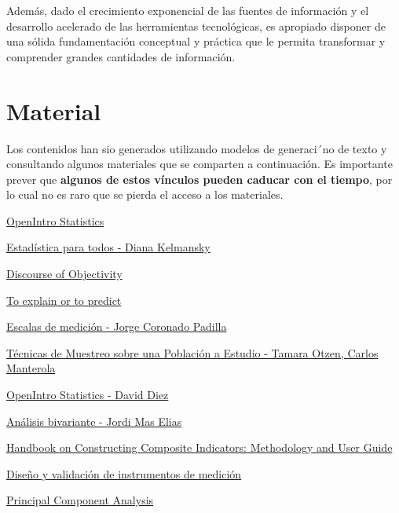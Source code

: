 \documentclass[
  letterpaper,
  DIV=11,
  numbers=noendperiod]{scrreprt}
\begin{document}
Además, dado el crecimiento exponencial de las fuentes de información y
el desarrollo acelerado de las herramientas tecnológicas, es apropiado
disponer de una sólida fundamentación conceptual y práctica que le
permita transformar y comprender grandes cantidades de información.

\section*{Material}\label{material}


Los contenidos han sio generados utilizando modelos de generaci´no de
texto y consultando algunos materiales que se comparten a continuación.
Es importante prever que \textbf{algunos de estos vínculos pueden
caducar con el tiempo}, por lo cual no es raro que se pierda el acceso a
los materiales.

\href{https://openintro.org/book/os/}{OpenIntro Statistics}

\href{http://www.bnm.me.gov.ar/giga1/documentos/EL001858.pdf}{Estadística
para todos - Diana Kelmansky}

\href{https://ayushthey.medium.com/discourse-of-objectivity-2eb2541f7177}{Discourse
of Objectivity}

\href{https://www.stat.berkeley.edu/~aldous/157/Papers/shmueli.pdf}{To
explain or to predict}

\href{https://dialnet.unirioja.es/descarga/articulo/4942056.pdf}{Escalas
de medición - Jorge Coronado Padilla}

\href{https://scielo.conicyt.cl/pdf/ijmorphol/v35n1/art37.pdf}{Técnicas
de Muestreo sobre una Población a Estudio - Tamara Otzen, Carlos
Manterola}

\href{https://openintro.org/go/?id=os4_for_screen_readers&referrer=/book/os/index.php}{OpenIntro
Statistics - David Diez}

\href{https://openaccess.uoc.edu/bitstream/10609/148455/1/AnalisisBivariante.pdf}{Análisis
bivariante - Jordi Mas Elias}

\href{https://www.istat.it/wp-content/uploads/2014/06/Handbook-on-Constructing-Composite-Indicators.pdf}{Handbook
on Constructing Composite Indicators: Methodology and User Guide}

\href{https://core.ac.uk/download/pdf/47265078.pdf}{Diseño y validación
de instrumentos de medición}

\href{http://cda.psych.uiuc.edu/statistical_learning_course/Jolliffe\%20I.\%20Principal\%20Component\%20Analysis\%20(2ed.,\%20Springer,\%202002)(518s)_MVsa_.pdf}{Principal
Component Analysis}
\end{document}
